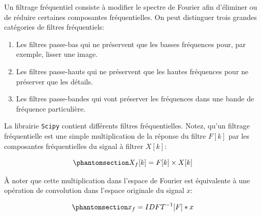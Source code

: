 \documentclass[
  11pt,
  letterpaper,
  open=any,
  twoside=false,
  french]{scrbook}
\begin{document}
Un filtrage fréquentiel consiste à modifier le spectre de Fourier afin
d'éliminer ou de réduire certaines composantes fréquentielles. On peut
distinguer trois grandes catégories de filtres fréquentiels:

\begin{enumerate}
\def\labelenumi{\arabic{enumi}.}
\item
  Les filtres passe-bas qui ne préservent que les basses fréquences
  pour, par exemple, lisser une image.
\item
  Les filtres passe-hauts qui ne préservent que les hautes fréquences
  pour ne préserver que les détails.
\item
  Les filtres passe-bandes qui vont préserver les fréquences dans une
  bande de fréquence particulière.
\end{enumerate}

La librairie \texttt{Scipy} contient différents filtres fréquentielles.
Notez, qu'un filtrage fréquentielle est une simple multiplication de la
réponse du filtre \(F[k]\) par les composantes fréquentielles du signal
à filtrer \(X[k]\):

\begin{equation}\phantomsection\label{eq-fourier-filter}{
X_f[k] = F[k] \times X[k]
}\end{equation}

À noter que cette multiplication dans l'espace de Fourier est
équivalente à une opération de convolution dans l'espace originale du
signal \(x\):

\begin{equation}\phantomsection\label{eq-convolve}{
x_f = IDFT^{-1}[F]*x
}\end{equation}
\end{document}
